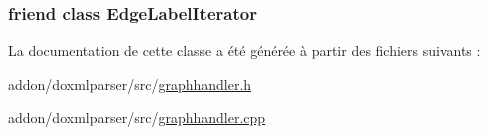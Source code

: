 \subsubsection[{Edge\+Label\+Iterator}]{\setlength{\rightskip}{0pt plus 5cm}friend class {\bf Edge\+Label\+Iterator}\hspace{0.3cm}{\ttfamily [friend]}}\label{class_edge_label_handler_af04914e6743dfa65bd97548d5db241fc}


La documentation de cette classe a été générée à partir des fichiers suivants \+:\begin{DoxyCompactItemize}
\item 
addon/doxmlparser/src/\hyperlink{graphhandler_8h}{graphhandler.\+h}\item 
addon/doxmlparser/src/\hyperlink{graphhandler_8cpp}{graphhandler.\+cpp}\end{DoxyCompactItemize}
